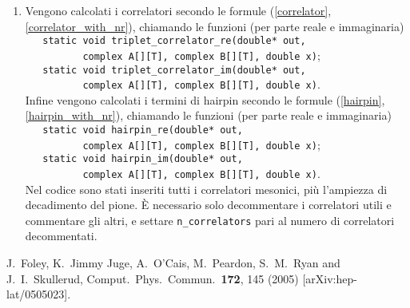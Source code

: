 \documentclass[a4paper]{article}
\begin{document}
\begin{enumerate}
\item Vengono calcolati i correlatori secondo le formule (\ref{correlator}, \ref{correlator_with_nr}), chiamando le funzioni (per parte reale e immaginaria)\\
\verb|   static void triplet_correlator_re(double* out,|\\
\verb|          complex A[][T], complex B[][T], double x)|;\\
\verb|   static void triplet_correlator_im(double* out,|\\
\verb|          complex A[][T], complex B[][T], double x)|.\\
Infine vengono calcolati i termini di hairpin secondo le formule (\ref{hairpin}, \ref{hairpin_with_nr}), chiamando le funzioni (per parte reale e immaginaria)\\
\verb|   static void hairpin_re(double* out,|\\
\verb|          complex A[][T], complex B[][T], double x)|;\\
\verb|   static void hairpin_im(double* out,|\\
\verb|          complex A[][T], complex B[][T], double x)|.\\
Nel codice sono stati inseriti tutti i correlatori mesonici, pi\`{u} l'ampiezza di decadimento del pione. \`{E} necessario solo decommentare i correlatori utili e commentare gli altri, e settare \verb|n_correlators| pari al numero di correlatori decommentati.

\end{enumerate}






\begin{thebibliography}{99}

  J.~Foley, K.~Jimmy Juge, A.~O'Cais, M.~Peardon, S.~M.~Ryan and J.~I.~Skullerud,
  Comput.\ Phys.\ Commun.\  {\bf 172}, 145 (2005)
  [arXiv:hep-lat/0505023].




\end{thebibliography}
\end{document}
